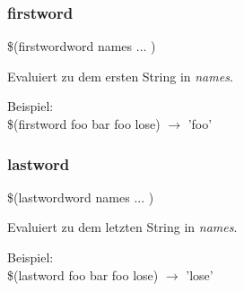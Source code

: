 \begin{frame}
	\frametitle{firstword}
	\begin{Large}\$(firstwordword names ... )\end{Large}

    \bigskip
	Evaluiert zu dem ersten String in \textit{names}.

    \bigskip 
    Beispiel: \\
	\$(firstword foo bar foo lose) $\longrightarrow$ 'foo'
\end{frame}

\begin{frame}
	\frametitle{lastword}
	\begin{Large}\$(lastwordword names ... )\end{Large}

    \bigskip
	Evaluiert zu dem letzten String in \textit{names}.

    \bigskip 
    Beispiel: \\
	\$(lastword foo bar foo lose) $\longrightarrow$ 'lose'
\end{frame}
